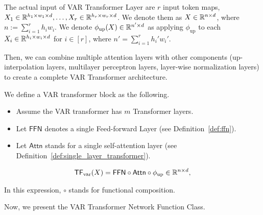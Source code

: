 \begin{remark} 
The actual input of VAR Transformer Layer are $r$ input token maps, $X_1 \in \mathbb{R}^{h_1 \times w_1 \times d}, \ldots, X_r \in \mathbb{R}^{h_r \times w_r \times d}$. We denote them as $X \in \mathbb{R}^{n \times d}$, where $n := \sum_{i = 1}^r h_i w_i$. We denote $\phi_{\mathrm{up}}(X) \in \mathbb{R}^{n' \times d}$ as applying $\phi_{\mathrm{up}}$ to each $X_i \in \mathbb{R}^{h_i \times w_i \times d}$ for $i \in [r]$, where $n' = \sum_{i=1}^r h_i' w_i'$. 
\end{remark}

Then, we can combine multiple attention layers with other components (up-interpolation layers, multilayer perceptron layers, layer-wise normalization layers) to create a complete VAR Transformer architecture.

\begin{definition}\label{def:var_transformer_single_layer}
We define a VAR transformer block as the following.
\begin{itemize}
    \item Assume the VAR transformer has $m$ Transformer layers.
    \item Let $\mathsf{FFN}$ denotes a single Feed-forward Layer (see Definition~\ref{def:ffn}).
    \item Let $\mathsf{Attn}$ stands for a single self-attention layer (see Definition~\ref{def:single_layer_transformer}).
\end{itemize}
\begin{align*}
    \mathsf{TF}_{\mathrm{var}}(X) = \mathsf{FFN} \circ \mathsf{Attn} \circ \phi_{\rm up} \in \mathbb{R}^{n \times d},
\end{align*}

In this expression, $\circ$ stands for functional composition.
\end{definition}

Now, we present the VAR Transformer Network Function Class.

